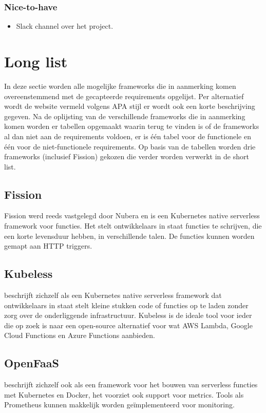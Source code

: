 \subsubsection{Nice-to-have}
\begin{itemize}
    \item Slack channel over het project.
\end{itemize}

\section{Long list}
In deze sectie worden alle mogelijke frameworks die in aanmerking komen overeenstemmend met de gecapteerde requirements opgelijst. Per alternatief wordt de website vermeld volgens APA stijl er wordt ook een korte beschrijving gegeven. Na de oplijsting van de verschillende frameworks die in aanmerking komen worden er tabellen opgemaakt waarin terug te vinden is of de frameworks al dan niet aan de requirements voldoen, er is één tabel voor de functionele en één voor de niet-functionele requirements. Op basis van de tabellen worden drie frameworks (inclusief Fission) gekozen die verder worden verwerkt in de short list.

\subsection{Fission}
Fission werd reeds vastgelegd door Nubera en is een Kubernetes native serverless framework voor functies. Het stelt ontwikkelaars in staat functies te schrijven, die een korte levensduur hebben, in verschillende talen. De functies kunnen worden gemapt aan HTTP triggers. \autocite{Fission2019}

\subsection{Kubeless}
\textcite{Kubeless2019} beschrijft zichzelf als een Kubernetes native serverless framework dat ontwikkelaars in staat stelt kleine stukken code of functies op te laden zonder zorg over de onderliggende infrastructuur. Kubeless is de ideale tool voor ieder die op zoek is naar een open-source alternatief voor wat AWS Lambda, Google Cloud Functions en Azure Functions aanbieden.

\subsection{OpenFaaS}
\textcite{OpenFaaS2019} beschrijft zichzelf ook als een framework voor het bouwen van serverless functies met Kubernetes en Docker, het voorziet ook support voor metrics. Tools als Prometheus kunnen makkelijk worden geïmplementeerd voor monitoring.

